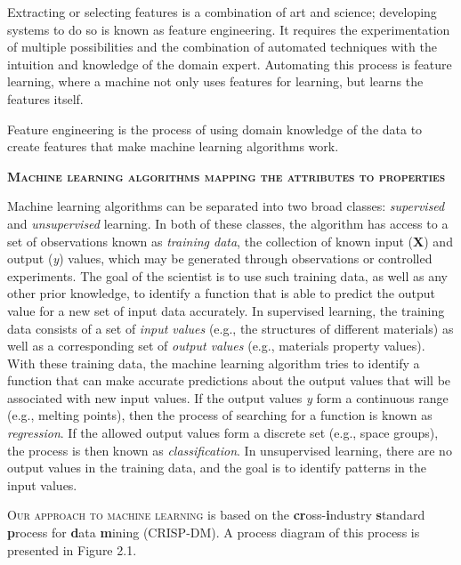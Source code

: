 \documentclass[10pt, letter]{report}
\renewcommand{\=}{\, =\, }
\newcommand{\+}{\, +\, }
\renewcommand{\-}{\, -\, }
\begin{document}
Extracting or selecting features is a combination of art and science; developing systems to do so is known as feature engineering. It requires the experimentation of multiple possibilities and the combination of automated techniques with the intuition and knowledge of the domain expert. Automating this process is feature learning, where a machine not only uses features for learning, but learns the features itself.

Feature engineering is the process of using domain knowledge of the data to create features that make machine learning algorithms work.

\textsc{\textbf{Machine learning algorithms mapping the attributes to properties}}

Machine learning algorithms can be separated into two broad classes: \textit{supervised} and \textit{unsupervised} learning. In both of these classes, the algorithm has access to a set of observations known as \textit{training data}, the collection of known input (\textbf{X}) and output (\textsl{y}) values, which may be generated through observations or controlled experiments. The goal of the scientist is to use such training data, as well as any other prior knowledge, to identify a function that is able to predict the output value for a new set of input data accurately. In supervised learning, the training data consists of a set of \textit{input values} (e.g., the structures of different materials) as well as a corresponding set of \textit{output values} (e.g., materials property values). With these training data, the machine learning algorithm tries to identify a function that can make accurate predictions about the output values that will be associated with new input values. If the output values \textsl{y} form a continuous range (e.g., melting points), then the process of searching for a function is known as \textit{regression}. If the allowed output values form a discrete set (e.g., space groups), the process is then known as \textit{classification}. In unsupervised learning, there are no output values in the training data, and the goal is to identify patterns in the input values.


\textsc{Our approach to machine learning} is based on the \textbf{cr}oss-\textbf{i}ndustry \textbf{s}tandard \textbf{p}rocess for \textbf{d}ata \textbf{m}ining (CRISP-DM). A process diagram of this process is presented in Figure 2.1.
\end{document}
